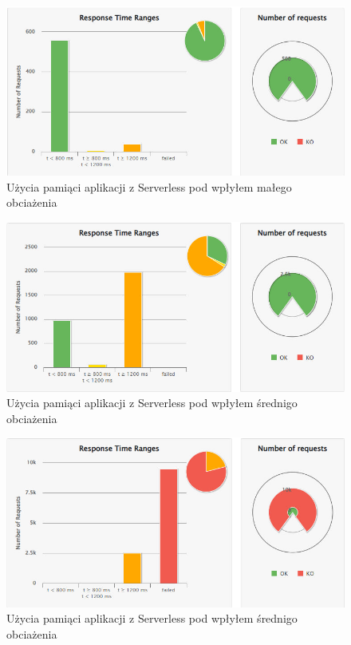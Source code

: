 \documentclass[runningheads,12pt]{llncs}
\begin{document}
\begin{figure}
    \includegraphics[width=\linewidth]{images/serverless-gatling-low-graph.jpg}
    \caption{Użycia pamiąci aplikacji z Serverless pod wpłyłem małego obciażenia} \label{fig1}
\end{figure}

\begin{figure}
    \includegraphics[width=\linewidth]{images/serverless-gatling-middle-graph.jpg}
    \caption{Użycia pamiąci aplikacji z Serverless pod wpłyłem średnigo obciażenia} \label{fig1}
\end{figure}

\begin{figure}
    \includegraphics[width=\linewidth]{images/serverless-gatling-high-graph.jpg}
    \caption{Użycia pamiąci aplikacji z Serverless pod wpłyłem średnigo obciażenia} \label{fig1}
\end{figure}
\end{document}
